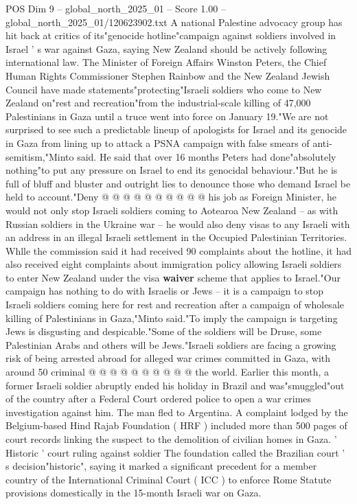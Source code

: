\begin{textsample}{POS Dim 9 – global\_north\_2025\_01 – Score 1.00 – global\_north\_2025\_01/120623902.txt}  \label{ex:f9_pos_416}
A national Palestine advocacy group has hit back at critics of its"genocide hotline"campaign against soldiers involved in Israel ' s war against Gaza, saying New Zealand should be actively following international law.
The Minister of Foreign Affairs Winston Peters, the Chief Human Rights Commissioner Stephen Rainbow and the New Zealand Jewish Council have made statements"protecting"Israeli soldiers who come to New Zealand on"rest and recreation"from the industrial-scale killing of 47,000 Palestinians in Gaza until a truce went into force on January 19."We are not surprised to see such a predictable lineup of apologists for Israel and its genocide in Gaza from lining up to attack a PSNA campaign with false smears of anti-semitism,"Minto said.
He said that over 16 months Peters had done"absolutely nothing"to put any pressure on Israel to end its genocidal behaviour."But he is full of bluff and bluster and outright lies to denounce those who demand Israel be held to account."Deny @ @ @ @ @ @ @ @ @ @ his job as Foreign Minister, he would not only stop Israeli soldiers coming to Aotearoa New Zealand -- as with Russian soldiers in the Ukraine war -- he would also deny visas to any Israeli with an address in an illegal Israeli settlement in the Occupied Palestinian Territories.
Whlle the commission said it had received 90 complaints about the hotline, it had also received eight complaints about immigration policy allowing Israeli soldiers to enter New Zealand under the visa \textbf{waiver} scheme that applies to Israel."Our campaign has nothing to do with Israelis or Jews -- it is a campaign to stop Israeli soldiers coming here for rest and recreation after a campaign of wholesale killing of Palestinians in Gaza,"Minto said."To imply the campaign is targeting Jews is disgusting and despicable."Some of the soldiers will be Druse, some Palestinian Arabs and others will be Jews."Israeli soldiers are facing a growing risk of being arrested abroad for alleged war crimes committed in Gaza, with around 50 criminal @ @ @ @ @ @ @ @ @ @ the world.
Earlier this month, a former Israeli soldier abruptly ended his holiday in Brazil and was"smuggled"out of the country after a Federal Court ordered police to open a war crimes investigation against him.
The man fled to Argentina.
A complaint lodged by the Belgium-based Hind Rajab Foundation ( HRF ) included more than 500 pages of court records linking the suspect to the demolition of civilian homes in Gaza. ' Historic ' court ruling against soldier The foundation called the Brazilian court ' s decision"historic", saying it marked a significant precedent for a member country of the International Criminal Court ( ICC ) to enforce Rome Statute provisions domestically in the 15-month Israeli war on Gaza.

\end{textsample}
